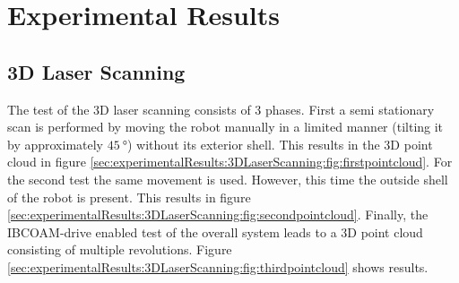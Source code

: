 \section{Experimental Results}
\label{sec:experimentalResults}

\subsection{3D Laser Scanning}
\label{sec:experimentalResults:3DLaserScanning}

The test of the 3D laser scanning consists of 3 phases.
First a semi stationary scan is performed by moving the robot manually in a limited manner (tilting it by approximately $\SI{45}{\degree}$) without its exterior shell.
This results in the 3D point cloud in figure \ref{sec:experimentalResults:3DLaserScanning:fig:firstpointcloud}.
For the second test the same movement is used.
However, this time the outside shell of the robot is present.
This results in figure \ref{sec:experimentalResults:3DLaserScanning:fig:secondpointcloud}.
Finally, the IBCOAM-drive enabled test of the overall system leads to a 3D point cloud consisting of multiple revolutions.
Figure \ref{sec:experimentalResults:3DLaserScanning:fig:thirdpointcloud} shows results.
